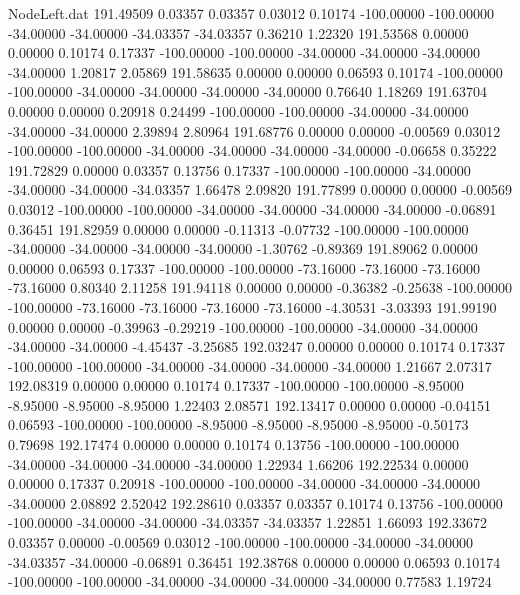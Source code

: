 \begin{filecontents}{NodeLeft.dat}
 191.49509    0.03357    0.03357     0.03012    0.10174 -100.00000 -100.00000  -34.00000  -34.00000  -34.03357  -34.03357    0.36210    1.22320
 191.53568    0.00000    0.00000     0.10174    0.17337 -100.00000 -100.00000  -34.00000  -34.00000  -34.00000  -34.00000    1.20817    2.05869
 191.58635    0.00000    0.00000     0.06593    0.10174 -100.00000 -100.00000  -34.00000  -34.00000  -34.00000  -34.00000    0.76640    1.18269
 191.63704    0.00000    0.00000     0.20918    0.24499 -100.00000 -100.00000  -34.00000  -34.00000  -34.00000  -34.00000    2.39894    2.80964
 191.68776    0.00000    0.00000    -0.00569    0.03012 -100.00000 -100.00000  -34.00000  -34.00000  -34.00000  -34.00000   -0.06658    0.35222
 191.72829    0.00000    0.03357     0.13756    0.17337 -100.00000 -100.00000  -34.00000  -34.00000  -34.00000  -34.03357    1.66478    2.09820
 191.77899    0.00000    0.00000    -0.00569    0.03012 -100.00000 -100.00000  -34.00000  -34.00000  -34.00000  -34.00000   -0.06891    0.36451
 191.82959    0.00000    0.00000    -0.11313   -0.07732 -100.00000 -100.00000  -34.00000  -34.00000  -34.00000  -34.00000   -1.30762   -0.89369
 191.89062    0.00000    0.00000     0.06593    0.17337 -100.00000 -100.00000  -73.16000  -73.16000  -73.16000  -73.16000    0.80340    2.11258
 191.94118    0.00000    0.00000    -0.36382   -0.25638 -100.00000 -100.00000  -73.16000  -73.16000  -73.16000  -73.16000   -4.30531   -3.03393
 191.99190    0.00000    0.00000    -0.39963   -0.29219 -100.00000 -100.00000  -34.00000  -34.00000  -34.00000  -34.00000   -4.45437   -3.25685
 192.03247    0.00000    0.00000     0.10174    0.17337 -100.00000 -100.00000  -34.00000  -34.00000  -34.00000  -34.00000    1.21667    2.07317
 192.08319    0.00000    0.00000     0.10174    0.17337 -100.00000 -100.00000   -8.95000   -8.95000   -8.95000   -8.95000    1.22403    2.08571
 192.13417    0.00000    0.00000    -0.04151    0.06593 -100.00000 -100.00000   -8.95000   -8.95000   -8.95000   -8.95000   -0.50173    0.79698
 192.17474    0.00000    0.00000     0.10174    0.13756 -100.00000 -100.00000  -34.00000  -34.00000  -34.00000  -34.00000    1.22934    1.66206
 192.22534    0.00000    0.00000     0.17337    0.20918 -100.00000 -100.00000  -34.00000  -34.00000  -34.00000  -34.00000    2.08892    2.52042
 192.28610    0.03357    0.03357     0.10174    0.13756 -100.00000 -100.00000  -34.00000  -34.00000  -34.03357  -34.03357    1.22851    1.66093
 192.33672    0.03357    0.00000    -0.00569    0.03012 -100.00000 -100.00000  -34.00000  -34.00000  -34.03357  -34.00000   -0.06891    0.36451
 192.38768    0.00000    0.00000     0.06593    0.10174 -100.00000 -100.00000  -34.00000  -34.00000  -34.00000  -34.00000    0.77583    1.19724

\end{filecontents}
